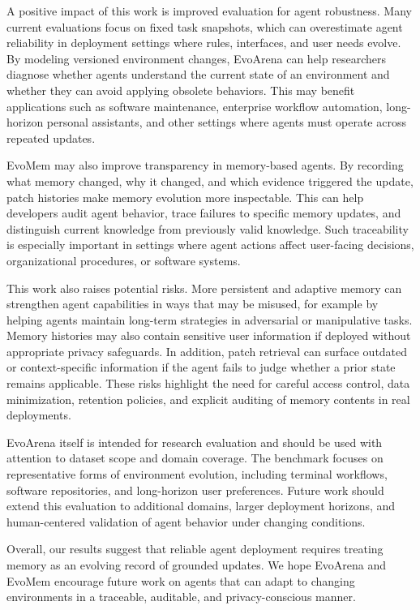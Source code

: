 \documentclass{article}
\begin{document}
A positive impact of this work is improved evaluation for agent robustness. Many current evaluations focus on fixed task snapshots, which can overestimate agent reliability in deployment settings where rules, interfaces, and user needs evolve. By modeling versioned environment changes, EvoArena can help researchers diagnose whether agents understand the current state of an environment and whether they can avoid applying obsolete behaviors. This may benefit applications such as software maintenance, enterprise workflow automation, long-horizon personal assistants, and other settings where agents must operate across repeated updates.

EvoMem may also improve transparency in memory-based agents. By recording what memory changed, why it changed, and which evidence triggered the update, patch histories make memory evolution more inspectable. This can help developers audit agent behavior, trace failures to specific memory updates, and distinguish current knowledge from previously valid knowledge. Such traceability is especially important in settings where agent actions affect user-facing decisions, organizational procedures, or software systems.

This work also raises potential risks. More persistent and adaptive memory can strengthen agent capabilities in ways that may be misused, for example by helping agents maintain long-term strategies in adversarial or manipulative tasks. Memory histories may also contain sensitive user information if deployed without appropriate privacy safeguards. In addition, patch retrieval can surface outdated or context-specific information if the agent fails to judge whether a prior state remains applicable. These risks highlight the need for careful access control, data minimization, retention policies, and explicit auditing of memory contents in real deployments.

EvoArena itself is intended for research evaluation and should be used with attention to dataset scope and domain coverage. The benchmark focuses on representative forms of environment evolution, including terminal workflows, software repositories, and long-horizon user preferences. Future work should extend this evaluation to additional domains, larger deployment horizons, and human-centered validation of agent behavior under changing conditions.

Overall, our results suggest that reliable agent deployment requires treating memory as an evolving record of grounded updates. We hope EvoArena and EvoMem encourage future work on agents that can adapt to changing environments in a traceable, auditable, and privacy-conscious manner.
\end{document}

